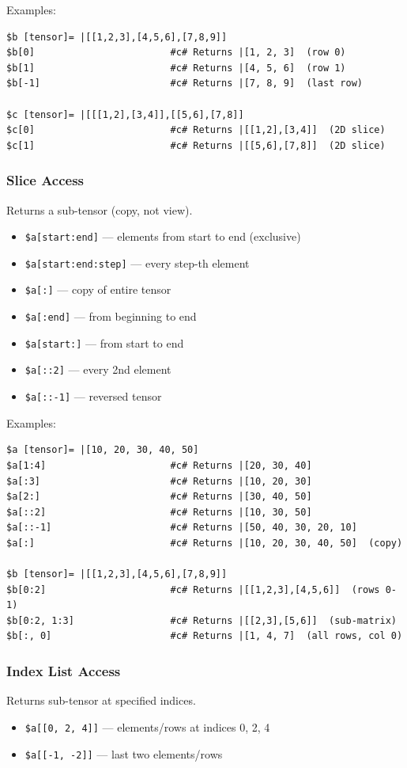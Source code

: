 Examples:
\begin{verbatim}
$b [tensor]= |[[1,2,3],[4,5,6],[7,8,9]]
$b[0]                        #c# Returns |[1, 2, 3]  (row 0)
$b[1]                        #c# Returns |[4, 5, 6]  (row 1)
$b[-1]                       #c# Returns |[7, 8, 9]  (last row)

$c [tensor]= |[[[1,2],[3,4]],[[5,6],[7,8]]
$c[0]                        #c# Returns |[[1,2],[3,4]]  (2D slice)
$c[1]                        #c# Returns |[[5,6],[7,8]]  (2D slice)
\end{verbatim}

\subsubsection{Slice Access}
Returns a sub-tensor (copy, not view).
\begin{itemize}
\item \texttt{\$a[start:end]} --- elements from start to end (exclusive)
\item \texttt{\$a[start:end:step]} --- every step-th element
\item \texttt{\$a[:]} --- copy of entire tensor
\item \texttt{\$a[:end]} --- from beginning to end
\item \texttt{\$a[start:]} --- from start to end
\item \texttt{\$a[::2]} --- every 2nd element
\item \texttt{\$a[::-1]} --- reversed tensor
\end{itemize}

Examples:
\begin{verbatim}
$a [tensor]= |[10, 20, 30, 40, 50]
$a[1:4]                      #c# Returns |[20, 30, 40]
$a[:3]                       #c# Returns |[10, 20, 30]
$a[2:]                       #c# Returns |[30, 40, 50]
$a[::2]                      #c# Returns |[10, 30, 50]
$a[::-1]                     #c# Returns |[50, 40, 30, 20, 10]
$a[:]                        #c# Returns |[10, 20, 30, 40, 50]  (copy)

$b [tensor]= |[[1,2,3],[4,5,6],[7,8,9]]
$b[0:2]                      #c# Returns |[[1,2,3],[4,5,6]]  (rows 0-1)
$b[0:2, 1:3]                 #c# Returns |[[2,3],[5,6]]  (sub-matrix)
$b[:, 0]                     #c# Returns |[1, 4, 7]  (all rows, col 0)
\end{verbatim}

\subsubsection{Index List Access}
Returns sub-tensor at specified indices.
\begin{itemize}
\item \texttt{\$a[[0, 2, 4]]} --- elements/rows at indices 0, 2, 4
\item \texttt{\$a[[-1, -2]]} --- last two elements/rows
\end{itemize}

